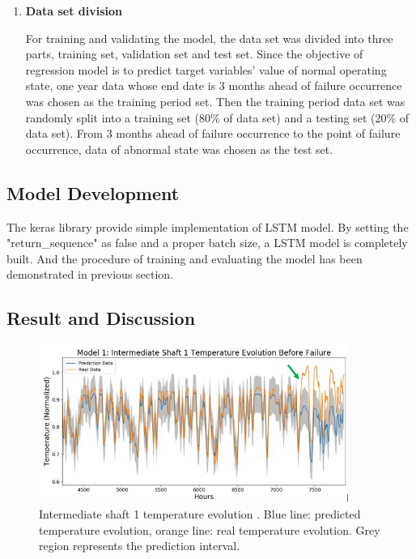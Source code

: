 \begin{enumerate}
\item \textbf{Data set division}

For training and validating the model, the data set was divided into three parts, training set, validation set and test set. Since the objective of regression model is to predict target variables' value of normal operating state, one year data whose end date is 3 months ahead of failure occurrence was chosen as the training period set. Then the training period data set was randomly split into a training set (80\% of data set) and a testing set (20\% of data set). From 3 months ahead of failure occurrence to the point of failure occurrence, data of abnormal state was chosen as the test set.

\end{enumerate}

\subsection{Model Development}
The keras library provide simple implementation of LSTM model. By setting the "return\_sequence" as false and a proper batch size, a LSTM model is completely built. And the procedure of training and evaluating the model has been demonstrated in previous section.

\subsection{Result and Discussion}

\begin{figure}[]
\centering
\includegraphics[width=0.9\textwidth]{figures/sofia_temp.png}
\caption{Intermediate shaft 1 temperature evolution \cite{Sofia}. Blue line: predicted temperature evolution, orange line: real temperature evolution. Grey region represents the prediction interval.}
\label{fig:B-B1}
\end{figure}

